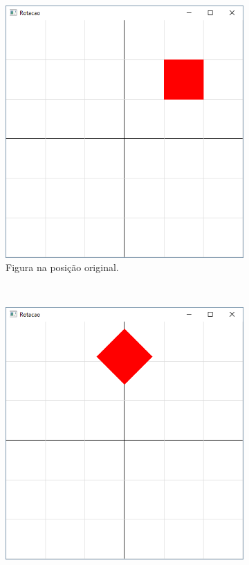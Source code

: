   \begin{figure}[H]
  \centering
  \begin{subfigure}{.25\textwidth}
    \includegraphics[width=.9\textwidth]{img/linear2a}
    \caption{Figura na posição original.} 
  \end{subfigure}
  ~
  \begin{subfigure}{.25\textwidth}
    \includegraphics[width=.9\textwidth]{img/linear2b}

\end{subfigure}
\end{figure}
